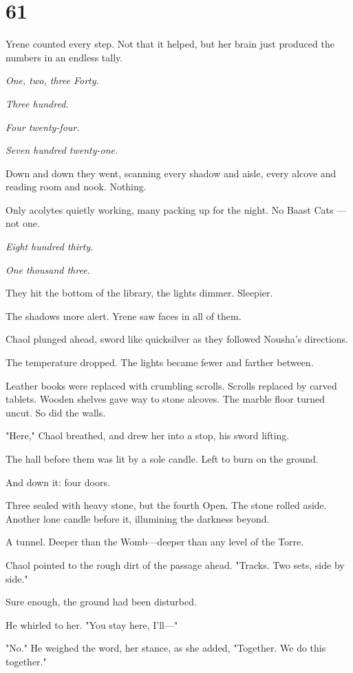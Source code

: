 
\chapter{61}

Yrene counted every step. Not that it helped, but her brain just produced the numbers in an endless tally.

\emph{One, two, three  Forty.}

\emph{Three hundred.}

\emph{Four twenty-four.}

\emph{Seven hundred twenty-one.}

Down and down they went, scanning every shadow and aisle, every alcove and reading room and nook. Nothing.

Only acolytes quietly working, many packing up for the night. No Baast Cats ---not one.

\emph{Eight hundred thirty.}

\emph{One thousand three.}

They hit the bottom of the library, the lights dimmer. Sleepier.

The shadows more alert. Yrene saw faces in all of them.

Chaol plunged ahead, sword like quicksilver as they followed Nousha's directions.

The temperature dropped. The lights became fewer and farther between.

Leather books were replaced with crumbling scrolls. Scrolls replaced by carved tablets. Wooden shelves gave way to stone alcoves. The marble floor turned uncut. So did the walls.

"Here," Chaol breathed, and drew her into a stop, his sword lifting.

The hall before them was lit by a sole candle. Left to burn on the ground.

And down it: four doors.

Three sealed with heavy stone, but the fourth  Open. The stone rolled aside. Another lone candle before it, illumining the darkness beyond.

A tunnel. Deeper than the Womb---deeper than any level of the Torre.

Chaol pointed to the rough dirt of the passage ahead. "Tracks. Two sets, side by side."

Sure enough, the ground had been disturbed.

He whirled to her. "You stay here, I'll---"

"No." He weighed the word, her stance, as she added, "Together. We do this together."


